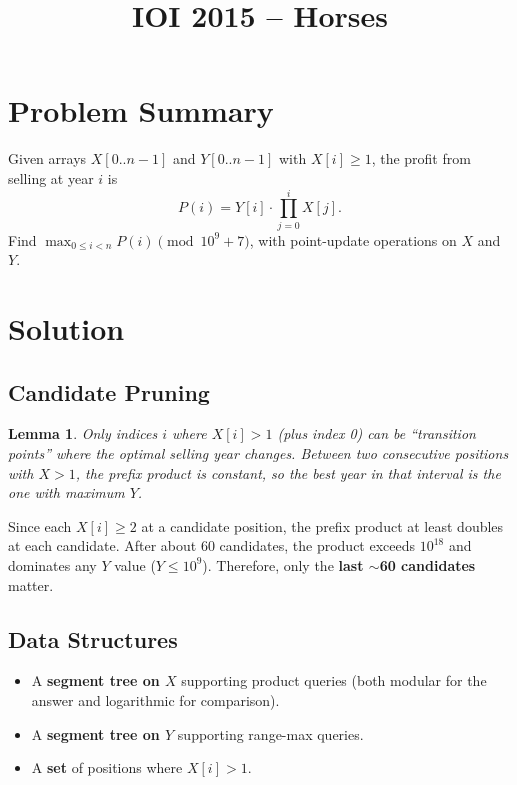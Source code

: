 \documentclass[11pt,a4paper]{article}
\title{IOI 2015 -- Horses}
\author{}
\date{}
\newtheorem{lemma}[theorem]{Lemma}
\begin{document}
\maketitle

\section{Problem Summary}

Given arrays $X[0..n{-}1]$ and $Y[0..n{-}1]$ with $X[i] \ge 1$, the profit from selling at year $i$ is
\[
  P(i) = Y[i] \cdot \prod_{j=0}^{i} X[j].
\]
Find $\max_{0 \le i < n} P(i) \pmod{10^9 + 7}$, with point-update operations on $X$ and $Y$.

\section{Solution}

\subsection{Candidate Pruning}

\begin{lemma}
Only indices $i$ where $X[i] > 1$ (plus index 0) can be ``transition points'' where the optimal selling year changes. Between two consecutive positions with $X > 1$, the prefix product is constant, so the best year in that interval is the one with maximum $Y$.
\end{lemma}

Since each $X[i] \ge 2$ at a candidate position, the prefix product at least doubles at each candidate. After about 60 candidates, the product exceeds $10^{18}$ and dominates any $Y$ value ($Y \le 10^9$). Therefore, only the \textbf{last $\sim$60 candidates} matter.

\subsection{Data Structures}

\begin{itemize}
  \item A \textbf{segment tree on $X$} supporting product queries (both modular for the answer and logarithmic for comparison).
  \item A \textbf{segment tree on $Y$} supporting range-max queries.
  \item A \textbf{set} of positions where $X[i] > 1$.
\end{itemize}
\end{document}
